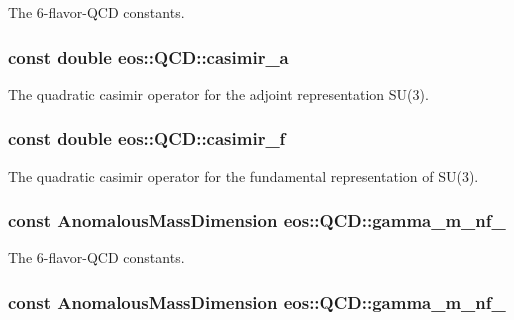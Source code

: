 \label{classeos_1_1QCD_abc5015326a2e2c0544aa5d2a392b7ea1}
The 6-\/flavor-\/QCD constants. \hypertarget{classeos_1_1QCD_ab74e057f2d2b9a05e3c8cbdbce9a2413}{
\subsubsection[{casimir\_\-a}]{\setlength{\rightskip}{0pt plus 5cm}const double {\bf eos::QCD::casimir\_\-a}}}
\label{classeos_1_1QCD_ab74e057f2d2b9a05e3c8cbdbce9a2413}
The quadratic casimir operator for the adjoint representation SU(3). \hypertarget{classeos_1_1QCD_a05f7ff1fada6145efece3310cde56e5a}{
\subsubsection[{casimir\_\-f}]{\setlength{\rightskip}{0pt plus 5cm}const double {\bf eos::QCD::casimir\_\-f}}}
\label{classeos_1_1QCD_a05f7ff1fada6145efece3310cde56e5a}
The quadratic casimir operator for the fundamental representation of SU(3). \hypertarget{classeos_1_1QCD_a1732d2faffdb5712fbb5e53f521bdb4f}{
\subsubsection[{gamma\_\-m\_\-nf\_\-3}]{\setlength{\rightskip}{0pt plus 5cm}const {\bf AnomalousMassDimension} {\bf eos::QCD::gamma\_\-m\_\-nf\_}}}
\label{classeos_1_1QCD_a1732d2faffdb5712fbb5e53f521bdb4f}
The 6-\/flavor-\/QCD constants. \hypertarget{classeos_1_1QCD_a2c39e24c316de9bceb7df4b6cce05665}{
\subsubsection[{gamma\_\-m\_\-nf\_\-4}]{\setlength{\rightskip}{0pt plus 5cm}const {\bf AnomalousMassDimension} {\bf eos::QCD::gamma\_\-m\_\-nf\_}}}
